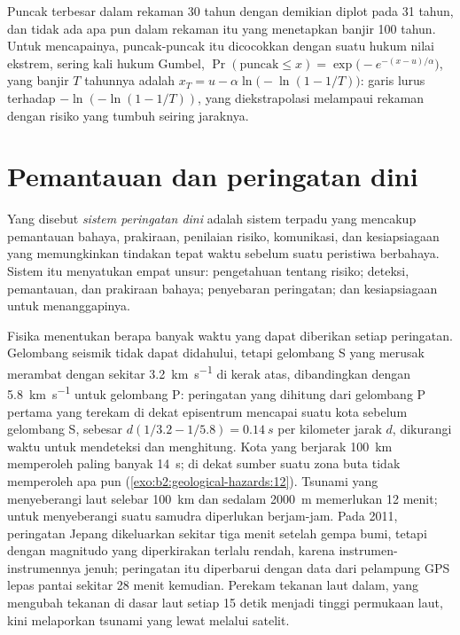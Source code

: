 Puncak terbesar dalam rekaman 30 tahun dengan demikian diplot pada 31 tahun, dan tidak ada apa pun dalam rekaman itu yang menetapkan
banjir 100 tahun. Untuk mencapainya, puncak-puncak itu dicocokkan dengan suatu hukum nilai ekstrem, sering kali hukum Gumbel,
$\Pr(\text{puncak} \leq x) = \exp\bigl(-e^{-(x - u)/\alpha}\bigr)$, yang banjir $T$ tahunnya adalah $x_T = u
- \alpha\ln\bigl(-\ln(1 - 1/T)\bigr)$: garis lurus terhadap $-\ln(-\ln(1 - 1/T))$, yang diekstrapolasi
melampaui rekaman dengan risiko yang tumbuh seiring jaraknya.

\section{Pemantauan dan peringatan dini}\label{sec:b2:geological-hazards:warning}

\begin{definition}\label{def:b2:geological-hazards:warning}
Yang disebut \emph{sistem peringatan dini} adalah sistem terpadu yang mencakup pemantauan
bahaya, prakiraan, penilaian risiko, komunikasi, dan kesiapsiagaan yang memungkinkan tindakan
tepat waktu sebelum suatu peristiwa berbahaya. Sistem itu menyatukan empat unsur: pengetahuan tentang risiko; deteksi,
pemantauan, dan prakiraan bahaya; penyebaran peringatan; dan kesiapsiagaan untuk
menanggapinya.
\end{definition}

Fisika menentukan berapa banyak waktu yang dapat diberikan setiap peringatan. Gelombang seismik tidak dapat didahului, tetapi gelombang S yang merusak
merambat dengan sekitar \qty{3.2}{km.s^{-1}} di kerak atas, dibandingkan dengan \qty{5.8}{km.s^{-1}} untuk
gelombang P: peringatan yang dihitung dari gelombang P pertama yang terekam di dekat episentrum mencapai suatu kota
sebelum gelombang S, sebesar $d(1/3.2 - 1/5.8) = \qty{0.14}{s}$ per kilometer jarak $d$, dikurangi
waktu untuk mendeteksi dan menghitung. Kota yang berjarak \qty{100}{km} memperoleh paling banyak \qty{14}{s}; di dekat sumber suatu
zona buta tidak memperoleh apa pun (\cref{exo:b2:geological-hazards:12}). Tsunami yang menyeberangi laut selebar \qty{100}{km}
dan sedalam \qty{2000}{m} memerlukan 12 menit; untuk menyeberangi suatu samudra diperlukan berjam-jam. Pada 2011, peringatan
Jepang dikeluarkan sekitar tiga menit setelah gempa bumi, tetapi dengan magnitudo yang diperkirakan terlalu rendah,
karena instrumen-instrumennya jenuh; peringatan itu diperbarui dengan data dari pelampung GPS lepas pantai sekitar 28 menit kemudian.
Perekam tekanan laut dalam, yang mengubah tekanan di dasar laut setiap 15 detik menjadi
tinggi permukaan laut, kini melaporkan tsunami yang lewat melalui satelit.

